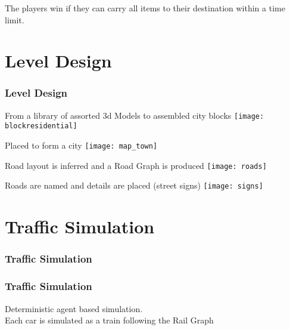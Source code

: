 \documentclass{beamer}
\begin{document}
\begin{frame}
The players win if they can carry all items to their destination within a time limit.
\end{frame}

\section{Level Design}

\begin{frame}
\frametitle{Level Design}
\end{frame}

\begin{frame}
	\begin{center}
	From a library of assorted 3d Models to assembled city blocks
	\texttt{[image: blockresidential]}
	\end{center}
\end{frame}

\begin{frame}
	\begin{center}
	Placed to form a city
	\texttt{[image: map\_town]}
	\end{center}
\end{frame}

\begin{frame}
	\begin{center}
	Road layout is inferred and a Road Graph is produced
	\texttt{[image: roads]}
	\end{center}
\end{frame}

\begin{frame}
	\begin{center}
	Roads are named and details are placed (street signs)
	\texttt{[image: signs]}
	\end{center}
\end{frame}

\section{Traffic Simulation}

\begin{frame}
\frametitle{Traffic Simulation}
\end{frame}

\begin{frame}
	\frametitle{Traffic Simulation}
	Deterministic agent based simulation. \\
	Each car is simulated as a train following the Rail Graph
\end{frame}
\end{document}
